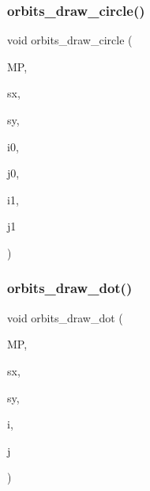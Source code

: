\mbox{\label{draw_8_c_aab67c26d29e82151142b788f15c5fe1e}} 
\subsubsection{\texorpdfstring{orbits\+\_\+draw\+\_\+circle()}{orbits\_draw\_circle()}}
{\footnotesize\ttfamily void orbits\+\_\+draw\+\_\+circle (\begin{DoxyParamCaption}\item[{\mbox{\hyperlink{classmp__graphics}{mp\+\_\+graphics}} \&}]{MP,  }\item[{\mbox{\hyperlink{galois_8h_a09fddde158a3a20bd2dcadb609de11dc}{I\+NT}}}]{sx,  }\item[{\mbox{\hyperlink{galois_8h_a09fddde158a3a20bd2dcadb609de11dc}{I\+NT}}}]{sy,  }\item[{\mbox{\hyperlink{galois_8h_a09fddde158a3a20bd2dcadb609de11dc}{I\+NT}}}]{i0,  }\item[{\mbox{\hyperlink{galois_8h_a09fddde158a3a20bd2dcadb609de11dc}{I\+NT}}}]{j0,  }\item[{\mbox{\hyperlink{galois_8h_a09fddde158a3a20bd2dcadb609de11dc}{I\+NT}}}]{i1,  }\item[{\mbox{\hyperlink{galois_8h_a09fddde158a3a20bd2dcadb609de11dc}{I\+NT}}}]{j1 }\end{DoxyParamCaption})}

\mbox{\label{draw_8_c_a20a270e8cc52b4a32cdd36bfa75d849e}} 
\subsubsection{\texorpdfstring{orbits\+\_\+draw\+\_\+dot()}{orbits\_draw\_dot()}}
{\footnotesize\ttfamily void orbits\+\_\+draw\+\_\+dot (\begin{DoxyParamCaption}\item[{\mbox{\hyperlink{classmp__graphics}{mp\+\_\+graphics}} \&}]{MP,  }\item[{\mbox{\hyperlink{galois_8h_a09fddde158a3a20bd2dcadb609de11dc}{I\+NT}}}]{sx,  }\item[{\mbox{\hyperlink{galois_8h_a09fddde158a3a20bd2dcadb609de11dc}{I\+NT}}}]{sy,  }\item[{\mbox{\hyperlink{galois_8h_a09fddde158a3a20bd2dcadb609de11dc}{I\+NT}}}]{i,  }\item[{\mbox{\hyperlink{galois_8h_a09fddde158a3a20bd2dcadb609de11dc}{I\+NT}}}]{j }\end{DoxyParamCaption})}

